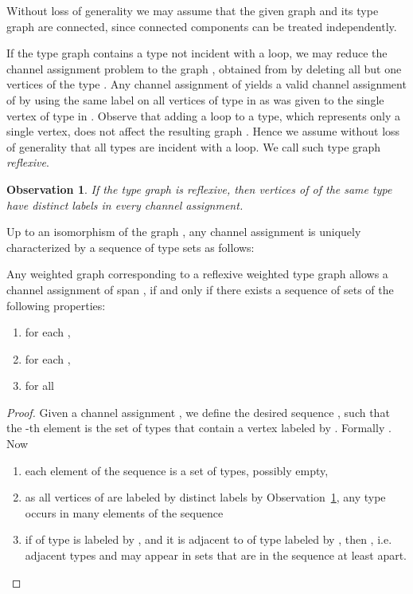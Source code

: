\documentclass[a4paper,UKenglish]{lipics}
\def\romanitems{
\renewcommand{\theenumi}{\roman{enumi}}
\renewcommand{\labelenumi}{(\theenumi)}
}
\theoremstyle{plain}
\newtheorem{observation}[theorem]{Observation}
\theoremstyle{definition}
\begin{document}
{Without loss of generality we may assume that the given graph  and its type graph  are connected, since connected components can be treated independently. 

If the type graph  contains a type  not incident with a loop, we may reduce the channel assignment 
problem to the graph , obtained from  by deleting all but one vertices of the type . 
Any channel assignment of  yields a valid channel assignment of  by using the same label on all vertices of type  in  as was given to the single vertex of type  in . Observe that adding a loop to a 
type, which represents only a single vertex, does not affect the resulting graph . Hence we assume without loss of generality that all types are incident with a loop. We call such type graph \emph{reflexive}. 

\begin{observation}\label{obs:refl}
If the type graph  is reflexive, then vertices of  of the same type have distinct labels in every channel assignment.
\end{observation}

Up to an isomorphism of the graph , any channel assignment  is uniquely characterized by a sequence of type sets as follows:

\begin{lemma}\label{lem:seq}
Any weighted graph  corresponding to a reflexive weighted type graph  
allows a channel assignment of span ,
if and only if there exists a sequence of sets 
 of the following properties:
\begin{enumerate}\romanitems
 \item  for each , 
 \item for each , 
 \item for all 
\end{enumerate}
\end{lemma}

\begin{proof}
Given a channel assignment , we define the desired sequence , such that the -th element is the set of types that contain a vertex labeled by . Formally .
Now
\begin{enumerate}\romanitems
\item each element of the sequence is a set of types, possibly empty,
\item as all vertices of  are labeled by distinct labels by Observation~\ref{obs:refl}, any type  occurs in  many elements of the sequence
\item if  of type  is labeled by , and it is adjacent to  of type  labeled by , then
, i.e. adjacent types  and  may appear in sets 
that are in the sequence at least  apart.
\end{enumerate}


\end{proof}}
\end{document}
